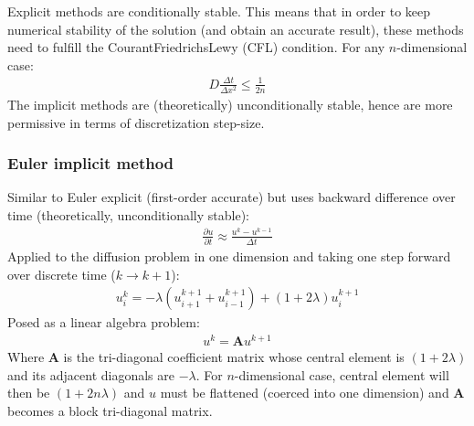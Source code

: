 \documentclass[letterpaper,10pt,english]{sphinxmanual}
\begin{document}
 Explicit methods are conditionally stable. This means that in
order to keep numerical stability of the solution (and obtain an
accurate result), these methods need to fulfill the
Courant\textendash{}Friedrichs\textendash{}Lewy (CFL) condition. For any \(n\)-dimensional
case:
\begin{equation*}
\begin{split}D\frac{\Delta t}{\Delta x^2}\leq\frac{1}{2n}\end{split}
\end{equation*}
The implicit methods are (theoretically) unconditionally stable, hence
are more permissive in terms of discretization step-size.


\subsubsection{Euler implicit method}
\label{\detokenize{diffusion:euler-implicit-method}}
Similar to Euler explicit (first-order accurate) but uses backward
difference over time (theoretically, unconditionally stable):
\begin{equation*}
\begin{split}\frac{\partial u}{\partial t}\approx\frac{u^k-u^{k-1}}{\Delta t}\end{split}
\end{equation*}
Applied to the diffusion problem in one dimension and taking one step
forward over discrete time (\(k\rightarrow k+1\)):
\begin{equation*}
\begin{split}u_i^k=-\lambda\left(u_{i+1}^{k+1}+u_{i-1}^{k+1}\right)+\left(1+2  \lambda\right)u_i^{k+1}\end{split}
\end{equation*}
Posed as a linear algebra problem:
\begin{equation*}
\begin{split}u^{k}=\mathbf{A}u^{k+1}\end{split}
\end{equation*}
Where \(\mathbf{A}\) is the tri-diagonal coefficient matrix whose
central element is \((1+2\lambda)\) and its adjacent diagonals are
\(-\lambda\). For \(n\)-dimensional case, central element will
then be \((1+2n\lambda)\) and \(u\) must be flattened (coerced
into one dimension) and \(\mathbf{A}\) becomes a block tri-diagonal
matrix.
\end{document}
